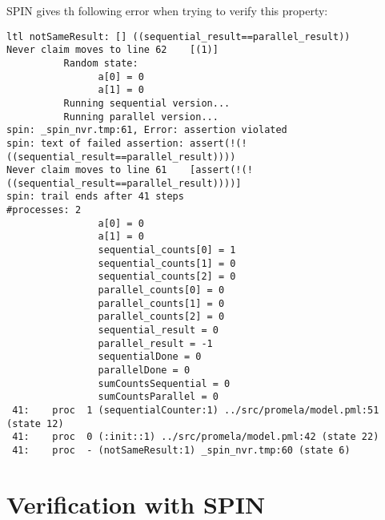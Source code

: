 \documentclass[a4paper, 11pt]{article}
\begin{document}
SPIN gives th following error when trying to verify this property:

\begin{lstlisting}
ltl notSameResult: [] ((sequential_result==parallel_result))
Never claim moves to line 62    [(1)]
          Random state:
                a[0] = 0
                a[1] = 0
          Running sequential version...
          Running parallel version...
spin: _spin_nvr.tmp:61, Error: assertion violated
spin: text of failed assertion: assert(!(!((sequential_result==parallel_result))))
Never claim moves to line 61    [assert(!(!((sequential_result==parallel_result))))]
spin: trail ends after 41 steps
#processes: 2
                a[0] = 0
                a[1] = 0
                sequential_counts[0] = 1
                sequential_counts[1] = 0
                sequential_counts[2] = 0
                parallel_counts[0] = 0
                parallel_counts[1] = 0
                parallel_counts[2] = 0
                sequential_result = 0
                parallel_result = -1
                sequentialDone = 0
                parallelDone = 0
                sumCountsSequential = 0
                sumCountsParallel = 0
 41:    proc  1 (sequentialCounter:1) ../src/promela/model.pml:51 (state 12)
 41:    proc  0 (:init::1) ../src/promela/model.pml:42 (state 22)
 41:    proc  - (notSameResult:1) _spin_nvr.tmp:60 (state 6)
\end{lstlisting}

\pagebreak

\section{Verification with SPIN}

% 
\end{document}
